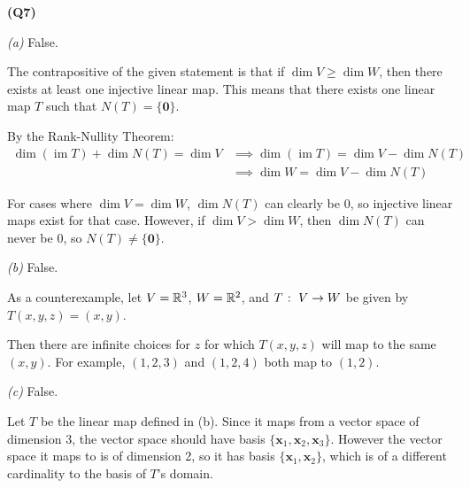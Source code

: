 \documentclass[12pt, a4paper]{article}
\newcommand{\im}{\operatorname{im}}
\begin{document}
\textbf{(Q7)}

\textit{(a)} False.

The contrapositive of the given statement is that if $\dim V \geq \dim W$,
then there exists at least one injective linear map. This means
that there exists one linear map $T$ such that $N(T) = \{\mathbf{0}\}$.

By the Rank-Nullity Theorem:
\begin{align*}
    \dim (\im T) + \dim N(T) = \dim V & \implies 
    \dim (\im T) = \dim V - \dim N(T)\\
    & \implies \dim W = \dim V - \dim N(T)
\end{align*}

For cases where $\dim V = \dim W$, $\dim N(T)$ can clearly be 0, so
injective linear maps exist for that case. However, if $\dim V > \dim W$,
then $\dim N(T)$ can never be 0, so $N(T) \neq \{\mathbf{0}\}$.

\emptyline
\textit{(b)} False.

As a counterexample, let $V = \mathbb{R}^3$, $W = \mathbb{R}^2$, and $T \; \colon \; V \to W$
be given by $T(x, y, z) = (x, y)$.

Then there are infinite choices for $z$ for which $T(x, y, z)$ will
map to the same $(x, y)$. For example, $(1, 2, 3)$ and $(1, 2, 4)$
both map to $(1, 2)$.

\emptyline
\textit{(c)} False.

Let $T$ be the linear map defined in (b). Since it maps from a vector
space of dimension 3, the vector space should have basis
$\{\mathbf{x}_1, \mathbf{x}_2, \mathbf{x}_3\}$. However the vector
space it maps to is of dimension 2, so it has basis
$\{\mathbf{x}_1, \mathbf{x}_2\}$, which is of a different cardinality to
the basis of $T$'s domain.
\end{document}

